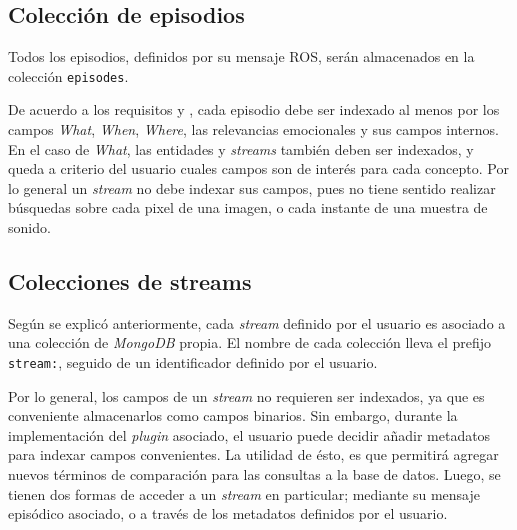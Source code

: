 \subsection{Colección de episodios}

Todos los episodios, definidos por su mensaje ROS, serán almacenados en la colección \texttt{episodes}.

De acuerdo a los requisitos  y , cada episodio debe ser indexado al menos por los campos \textit{What}, \textit{When}, \textit{Where}, las relevancias emocionales y sus campos internos. En el caso de \textit{What}, las entidades y \textit{streams} también deben ser indexados, y queda a criterio del usuario cuales campos son de interés para cada concepto. Por lo general un \textit{stream} no debe indexar sus campos, pues no tiene sentido realizar búsquedas sobre cada pixel de una imagen, o cada instante de una muestra de sonido.


\subsection{Colecciones de streams}

Según se explicó anteriormente, cada \textit{stream} definido por el usuario es asociado a una colección de \textit{MongoDB} propia. El nombre de cada colección lleva el prefijo \texttt{stream:}, seguido de un identificador definido por el usuario.

Por lo general, los campos de un \textit{stream} no requieren ser indexados, ya que es conveniente almacenarlos como campos binarios. Sin embargo, durante la implementación del \textit{plugin} asociado, el usuario puede decidir añadir metadatos para indexar campos convenientes. La utilidad de ésto, es que permitirá agregar nuevos términos de comparación para las consultas a la base de datos. Luego, se tienen dos formas de acceder a un \textit{stream} en particular; mediante su mensaje episódico asociado, o a través de los metadatos definidos por el usuario.

